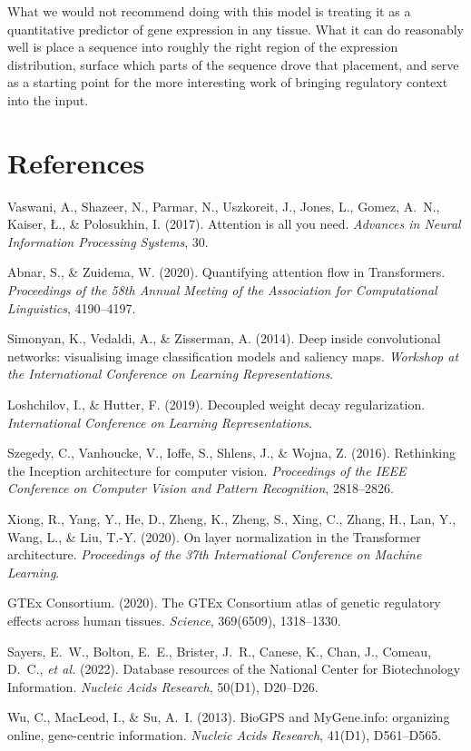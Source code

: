 \documentclass[11pt,a4paper]{article}
\begin{document}
What we would not recommend doing with this model is treating it as a quantitative predictor of gene expression in any tissue. What it can do reasonably well is place a sequence into roughly the right region of the expression distribution, surface which parts of the sequence drove that placement, and serve as a starting point for the more interesting work of bringing regulatory context into the input.

\section{References}

\begin{enumerate}[label={[\arabic*]},leftmargin=*,itemsep=2pt]
    \item Vaswani, A., Shazeer, N., Parmar, N., Uszkoreit, J., Jones, L., Gomez, A.~N., Kaiser, {\L}., \& Polosukhin, I. (2017). Attention is all you need. \emph{Advances in Neural Information Processing Systems}, 30.
    \item Abnar, S., \& Zuidema, W. (2020). Quantifying attention flow in Transformers. \emph{Proceedings of the 58th Annual Meeting of the Association for Computational Linguistics}, 4190--4197.
    \item Simonyan, K., Vedaldi, A., \& Zisserman, A. (2014). Deep inside convolutional networks: visualising image classification models and saliency maps. \emph{Workshop at the International Conference on Learning Representations}.
    \item Loshchilov, I., \& Hutter, F. (2019). Decoupled weight decay regularization. \emph{International Conference on Learning Representations}.
    \item Szegedy, C., Vanhoucke, V., Ioffe, S., Shlens, J., \& Wojna, Z. (2016). Rethinking the Inception architecture for computer vision. \emph{Proceedings of the IEEE Conference on Computer Vision and Pattern Recognition}, 2818--2826.
    \item Xiong, R., Yang, Y., He, D., Zheng, K., Zheng, S., Xing, C., Zhang, H., Lan, Y., Wang, L., \& Liu, T.-Y. (2020). On layer normalization in the Transformer architecture. \emph{Proceedings of the 37th International Conference on Machine Learning}.
    \item GTEx Consortium. (2020). The GTEx Consortium atlas of genetic regulatory effects across human tissues. \emph{Science}, 369(6509), 1318--1330.
    \item Sayers, E.~W., Bolton, E.~E., Brister, J.~R., Canese, K., Chan, J., Comeau, D.~C., \emph{et al.} (2022). Database resources of the National Center for Biotechnology Information. \emph{Nucleic Acids Research}, 50(D1), D20--D26.
    \item Wu, C., MacLeod, I., \& Su, A.~I. (2013). BioGPS and MyGene.info: organizing online, gene-centric information. \emph{Nucleic Acids Research}, 41(D1), D561--D565.
\end{enumerate}
\end{document}
